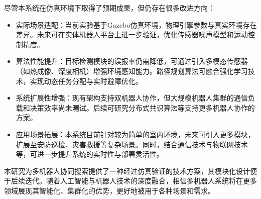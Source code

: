 尽管本系统在仿真环境下取得了预期成果，但仍存在很多改进方向：
\begin{itemize}


    \item 实际场景适配：当前实验基于Gazebo仿真环境，物理引擎参数与真实环境存在差异。未来可在实体机器人平台上进一步验证，优化传感器噪声模型和运动控制精度。

    \item 算法性能提升：目标检测模块的误报率仍需降低，可通过引入多模态传感器（如热成像、深度相机）增强环境感知能力。路径规划算法可融合强化学习技术，实现动态任务分配与实时避障优化。

    \item 系统扩展性增强：现有架构支持双机器人协作，但大规模机器人集群的通信负载和决策效率尚未测试。后续可研究分布式共识算法等支持更多机器人协作的方案。

    \item 应用场景拓展：本系统目前针对较为简单的室内环境，未来可引入更多模块，扩展至安防巡检、灾害救援等复杂场景。同时，结合通信技术与物联网技术等，可进一步提升系统的实时性与部署灵活性。
\end{itemize}
本研究为多机器人协同搜索提供了一种经过仿真验证的技术方案，其模块化设计便于后续迭代。随着人工智能与机器人技术的深度融合，相信多机器人系统将在更多领域展现其智能化、集群化的优势，更好地被用于各种场景和需求。